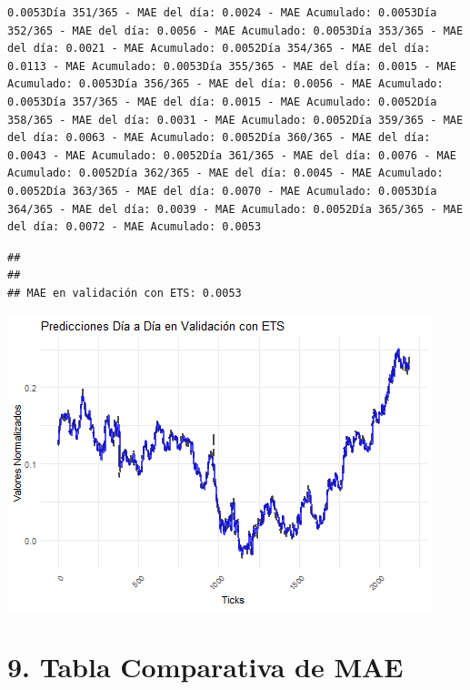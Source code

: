 \documentclass[
]{book}
\begin{document}
\begin{verbatim}
0.0053Día 351/365 - MAE del día: 0.0024 - MAE Acumulado: 0.0053Día 352/365 - MAE del día: 0.0056 - MAE Acumulado: 0.0053Día 353/365 - MAE del día: 0.0021 - MAE Acumulado: 0.0052Día 354/365 - MAE del día: 0.0113 - MAE Acumulado: 0.0053Día 355/365 - MAE del día: 0.0015 - MAE Acumulado: 0.0053Día 356/365 - MAE del día: 0.0056 - MAE Acumulado: 0.0053Día 357/365 - MAE del día: 0.0015 - MAE Acumulado: 0.0052Día 358/365 - MAE del día: 0.0031 - MAE Acumulado: 0.0052Día 359/365 - MAE del día: 0.0063 - MAE Acumulado: 0.0052Día 360/365 - MAE del día: 0.0043 - MAE Acumulado: 0.0052Día 361/365 - MAE del día: 0.0076 - MAE Acumulado: 0.0052Día 362/365 - MAE del día: 0.0045 - MAE Acumulado: 0.0052Día 363/365 - MAE del día: 0.0070 - MAE Acumulado: 0.0053Día 364/365 - MAE del día: 0.0039 - MAE Acumulado: 0.0052Día 365/365 - MAE del día: 0.0072 - MAE Acumulado: 0.0053
\end{verbatim}

\begin{verbatim}
## 
## 
## MAE en validación con ETS: 0.0053
\end{verbatim}

\includegraphics{bookdown_time_series_files/figure-latex/unnamed-chunk-18-1.png}

\section{9. Tabla Comparativa de MAE}\label{tabla-comparativa-de-mae}
\end{document}
